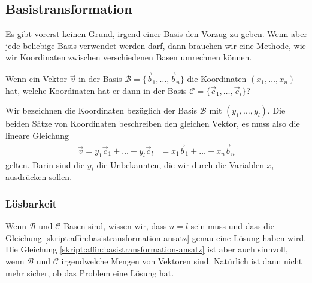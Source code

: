 %
%
\subsection{Basistransformation}
Es gibt vorerst keinen Grund, irgend einer Basis den Vorzug zu geben.
Wenn aber jede beliebige Basis verwendet werden darf, dann
brauchen wir eine Methode, wie wir Koordinaten zwischen verschiedenen
Basen umrechnen können.

\begin{aufgabe}
\label{skript:affin:basiswechsel:aufgabe}
Wenn ein Vektor $\vec{v}$ in der Basis
$\mathcal{B}=\{\vec{b}_1,\dots,\vec{b}_n\}$
die Koordinaten $(x_1,\dots,x_n)$ hat, welche Koordinaten hat er dann in
der Basis $\mathcal{C}=\{\vec{c}_1,\dots,\vec{c}_l\}$?
\end{aufgabe}

Wir bezeichnen die Koordinaten bezüglich der Basis $\mathcal{B}$
mit $(y_1,\dots,y_l)$.
Die beiden Sätze von Koordinaten beschreiben den gleichen Vektor,
es muss also die lineare Gleichung
\begin{align}
\vec{v}
=
y_1\vec{c}_1 + \dots + y_l\vec{c}_l
&=
x_1\vec{b}_1 + \dots + x_n\vec{b}_n
\label{skript:affin:basistransformation-ansatz}
\end{align}
gelten.
Darin sind die $y_i$ die Unbekannten, die wir durch die Variablen $x_i$
ausdrücken sollen.

\subsubsection{Lösbarkeit}
Wenn $\mathcal{B}$ und $\mathcal{C}$ Basen sind, wissen wir, dass
$n=l$ sein muss und dass die Gleichung
\eqref{skript:affin:basistransformation-ansatz}
genau eine Lösung haben wird.
Die Gleichung
\eqref{skript:affin:basistransformation-ansatz}
ist aber auch sinnvoll, wenn $\mathcal{B}$ und $\mathcal{C}$ irgendwelche
Mengen von Vektoren sind.
Natürlich ist dann nicht mehr sicher, ob das Problem eine Lösung hat.

